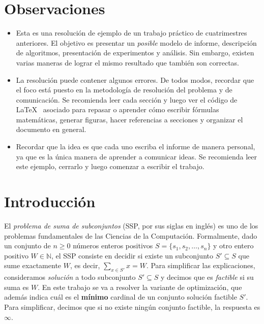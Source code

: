 \documentclass[10pt,a4paper]{article}
\begin{document}

\fecha{}



\maketitle
\thispagestyle{empty}
\section*{Observaciones}
\begin{itemize}
    \item Esta es una resolución de ejemplo de un trabajo práctico de cuatrimestres anteriores. El objetivo es presentar un \emph{posible} modelo de informe, descripción de algoritmos, presentación de experimentos y análisis. Sin embargo, existen varias maneras de lograr el mismo resultado que también son correctas.
    \item La resolución puede contener algunos errores. De todos modos, recordar que el foco está puesto en la metodología de resolución del problema y de comunicación. Se recomienda leer cada sección y luego ver el código de \LaTeX~ asociado para repasar o aprender cómo escribir fórmulas matemáticas, generar figuras, hacer referencias a secciones y organizar el documento en general.
    \item Recordar que la idea es que cada uno escriba el informe de manera personal, ya que es la única manera de aprender a comunicar ideas. Se recomienda leer este ejemplo, cerrarlo y luego comenzar a escribir el trabajo.
\end{itemize}
\newpage
\setcounter{page}{1}

\section{Introducción} \label{sec:introduccion}
El \emph{problema de suma de subconjuntos} (SSP, por sus siglas en inglés) es uno de los problemas fundamentales de las Ciencias de la Computación. Formalmente, dado un conjunto de $n \geq 0$ números enteros positivos $S = \{ s_1, s_2, \hdots, s_n \}$ y otro entero positivo $W \in \mathbb{N}$, el SSP consiste en decidir si existe un subconjunto $S' \subseteq S$ que sume exactamente $W$, es decir, $\sum_{x \in S'} x = W$. Para simplificar las explicaciones, consideramos \emph{solución} a todo subconjunto $S' \subseteq S$ y decimos que es \emph{factible} si su suma es $W$. En este trabajo se va a resolver la variante de optimización, que además indica cuál es el \textbf{mínimo} cardinal de un conjunto solución factible $S'$. Para simplificar, decimos que si no existe ningún conjunto factible, la respuesta es $\infty$.\\
\end{document}
